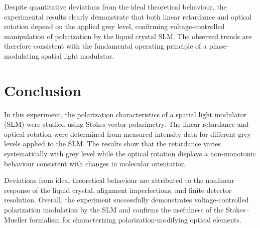 Despite quantitative deviations from the ideal theoretical behaviour, the experimental results clearly demonstrate that both linear retardance and optical rotation depend on the applied grey level, confirming voltage-controlled manipulation of polarization by the liquid crystal SLM. The observed trends are therefore consistent with the fundamental operating principle of a phase-modulating spatial light modulator.
\section{Conclusion}

In this experiment, the polarization characteristics of a spatial light modulator (SLM) were studied using Stokes vector polarimetry. The linear
retardance and optical rotation were determined from measured intensity data for different grey levels applied to the SLM. The results show that
the retardance varies systematically with grey level while the optical rotation displays a non-monotonic behaviour consistent with changes in molecular orientation.

Deviations from ideal theoretical behaviour are attributed to the nonlinear response of the liquid crystal, alignment imperfections, and finite detector resolution. Overall, the experiment successfully demonstrates voltage-controlled polarization modulation by the SLM and confirms the usefulness of the Stokes--Mueller formalism for characterizing polarization-modifying optical elements.

